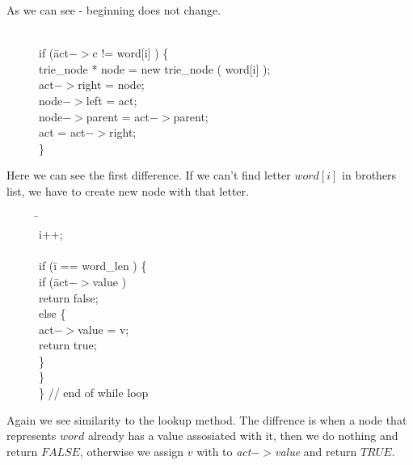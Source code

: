 \documentclass[a4paper,12pt]{article}
\begin{document}
\noindent As we can see - beginning does not change.

\begin{figure}[!h]
\begin{tabbing}
\quad \quad \quad \quad \= \\
\>    if (\= act$->$c != word[i] ) \{ \\
\>\>      trie\_node * node = new trie\_node ( word[i] ); \\
\>\>      act$->$right = node; \\
\>\>      node$->$left = act; \\
\>\>      node$->$parent = act$->$parent; \\
\>\>      act = act$->$right; \\
\>    \} \\
\end{tabbing}
\end{figure}

\noindent Here we can see the first difference. If we can't find letter $word[i]$ in brothers list, we have to create new node with that letter.

\newpage

\begin{figure}[!h]
\begin{tabbing}
\quad \quad \= \quad \quad \= \\
\>\>   i++; \\
\>\>	\\
\>\>   if (\= i == word\_len ) \{ \\
\>\>\>      if (\= act$->$value ) \\
\>\>\>\>        return false; \\
\>\>\>      else \{ \\
\>\>\>\>     	act$->$value = v; \\
\>\>\>\>     	return true; \\
\>\>\>     \} \\
\>\>    \} \\
\>  \} // end of while loop \\
\end{tabbing}
\end{figure}

\noindent Again we see similarity to the lookup method. The diffrence is when a node that represents $word$ already has a value assosiated with it, then we do nothing and return $FALSE$, otherwise we assign $v$ with to \emph{act$->$value} and return $TRUE$.
\end{document}
